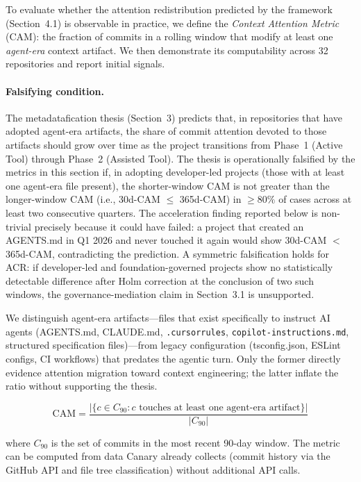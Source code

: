 \documentclass[12pt]{article}
\begin{document}
To evaluate whether the attention redistribution predicted by the framework (Section~4.1) is observable in practice, we define the \textit{Context Attention Metric} (CAM): the fraction of commits in a rolling window that modify at least one \textit{agent-era} context artifact. We then demonstrate its computability across 32 repositories and report initial signals.

\paragraph{Falsifying condition.} The metadatafication thesis (Section~3) predicts that, in repositories that have adopted agent-era artifacts, the share of commit attention devoted to those artifacts should grow over time as the project transitions from Phase~1 (Active Tool) through Phase~2 (Assisted Tool). The thesis is operationally falsified by the metrics in this section if, in adopting developer-led projects (those with at least one agent-era file present), the shorter-window CAM is not greater than the longer-window CAM (i.e., 30d-CAM $\leq$ 365d-CAM) in $\geq 80\%$ of cases across at least two consecutive quarters. The acceleration finding reported below is non-trivial precisely because it could have failed: a project that created an AGENTS.md in Q1 2026 and never touched it again would show 30d-CAM $<$ 365d-CAM, contradicting the prediction. A symmetric falsification holds for ACR: if developer-led and foundation-governed projects show no statistically detectable difference after Holm correction at the conclusion of two such windows, the governance-mediation claim in Section~3.1 is unsupported.

We distinguish agent-era artifacts---files that exist specifically to instruct AI agents (AGENTS.md, CLAUDE.md, \texttt{.cursorrules}, \texttt{copilot-instructions.md}, structured specification files)---from legacy configuration (tsconfig.json, ESLint configs, CI workflows) that predates the agentic turn. Only the former directly evidence attention migration toward context engineering; the latter inflate the ratio without supporting the thesis.

\begin{equation}
\text{CAM} = \frac{|\{c \in C_{90} : c \text{ touches at least one agent-era artifact}\}|}{|C_{90}|}
\end{equation}

\noindent where $C_{90}$ is the set of commits in the most recent 90-day window. The metric can be computed from data Canary already collects (commit history via the GitHub API and file tree classification) without additional API calls.
\end{document}

